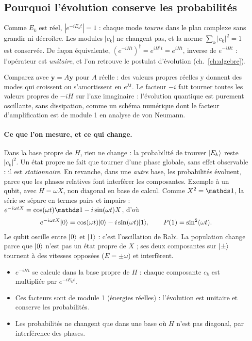 \subsection{Pourquoi l'évolution conserve les probabilités}
Comme $E_k$ est réel, $|e^{-iE_kt}|=1$ : chaque mode \emph{tourne} dans le plan complexe sans grandir ni décroître. Les modules $|c_k|$ ne changent pas, et la norme $\sum_k|c_k|^2=1$ est conservée. De façon équivalente, $(e^{-iHt})^\dagger=e^{iH^\dagger t}=e^{iHt}$, inverse de $e^{-iHt}$ : l'opérateur est \emph{unitaire}, et l'on retrouve le postulat d'évolution (ch.~\ref{ch:algebre}).

Comparez avec $\dot{\mathbf y}=A\mathbf y$ pour $A$ réelle : des valeurs propres réelles y donnent des modes qui croissent ou s'amortissent en $e^{\lambda t}$. Le facteur $-i$ fait tourner toutes les valeurs propres de $-iH$ sur l'axe imaginaire : l'évolution quantique est purement oscillante, sans dissipation, comme un schéma numérique dont le facteur d'amplification est de module 1 en analyse de von Neumann.

\paragraph{Ce que l'on mesure, et ce qui change.} Dans la base propre de $H$, rien ne change : la probabilité de trouver $\lvert E_k\rangle$ reste $|c_k|^2$. Un état propre ne fait que tourner d'une phase globale, sans effet observable : il est \emph{stationnaire}. En revanche, dans une \emph{autre} base, les probabilités évoluent, parce que les phases relatives font interférer les composantes. Exemple à un qubit, avec $H=\omega X$, non diagonal en base de calcul. Comme $X^2=\Id$, la série se sépare en termes pairs et impairs : $e^{-i\omega tX}=\cos(\omega t)\Id-i\sin(\omega t)X$, d'où
\[ e^{-i\omega tX}\lvert 0\rangle=\cos(\omega t)\lvert 0\rangle-i\sin(\omega t)\lvert 1\rangle,\qquad P(1)=\sin^2(\omega t). \]
Le qubit oscille entre $\lvert 0\rangle$ et $\lvert 1\rangle$ : c'est l'oscillation de Rabi. La population change parce que $\lvert 0\rangle$ n'est pas un état propre de $X$ ; ses deux composantes sur $\lvert \pm\rangle$ tournent à des vitesses opposées ($E=\pm\omega$) et interfèrent.

\begin{resultat}
\begin{itemize}
\item $e^{-iHt}$ se calcule dans la base propre de $H$ : chaque composante $c_k$ est multipliée par $e^{-iE_kt}$.
\item Ces facteurs sont de module 1 (énergies réelles) : l'évolution est unitaire et conserve les probabilités.
\item Les probabilités ne changent que dans une base où $H$ n'est pas diagonal, par interférence des phases.
\end{itemize}
\end{resultat}

